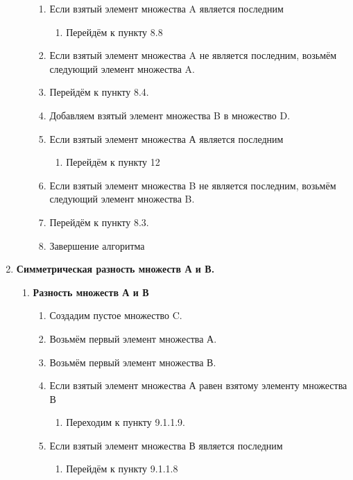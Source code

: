 \documentclass[a4paper,12pt]{extarticle}
\begin{document}
\begin{enumerate}
\begin{enumerate}[label*=\arabic*.]
\begin{enumerate}[label*=\arabic*.]
    \item Если взятый элемент множества A является последним
    \begin{enumerate}[label*=\arabic*.]
      \item Перейдём к пункту 8.8
    \end{enumerate}
    \item Если взятый элемент множества A не является последним, возьмём следующий элемент множества A.
    \item Перейдём к пункту 8.4.
    \item Добавляем взятый элемент множества B в множество D.
    \item Если взятый элемент множества А является последним
    \begin{enumerate}[label*=\arabic*.]
      \item Перейдём к пункту 12
    \end{enumerate}
    \item Если взятый элемент множества B не является последним, возьмём следующий элемент множества B.
    \item Перейдём к пункту 8.3.
    \item Завершение алгоритма
  \end{enumerate}
  \end{enumerate}
  \item \textbf{Симметрическая разность множеств А и В.}
  \begin{enumerate}[label*=\arabic*.]
    \item \textbf{Разность множеств А и В}
    \begin{enumerate}[label*=\arabic*.]
      \item Создадим пустое множество C.
      \item Возьмём первый элемент множества А.
      \item Возьмём первый элемент множества В.
      \item Если взятый элемент множества А равен взятому элементу множества В
      \begin{enumerate}[label*=\arabic*.]
        \item Переходим к пункту 9.1.1.9.
      \end{enumerate}
      \item Если взятый элемент множества В является последним
      \begin{enumerate}[label*=\arabic*.]
        \item Перейдём к пункту 9.1.1.8
      \end{enumerate}

\end{enumerate}
\end{enumerate}
\end{enumerate}
\end{document}
